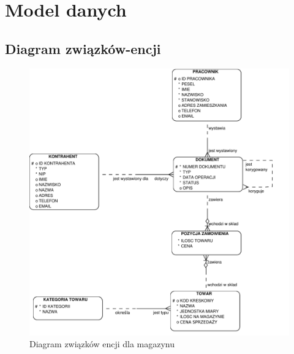 \section{Model danych}

\subsection{Diagram związków-encji}

\begin{figure}[!htb]
  \begin{center}
    \includegraphics[scale=0.7]{../img/model/diagram_er_magazyn.pdf}
  \end{center}
  \caption{Diagram związków encji dla magazynu}
  \label{fig:magazyn-er}
\end{figure}
\FloatBarrier

